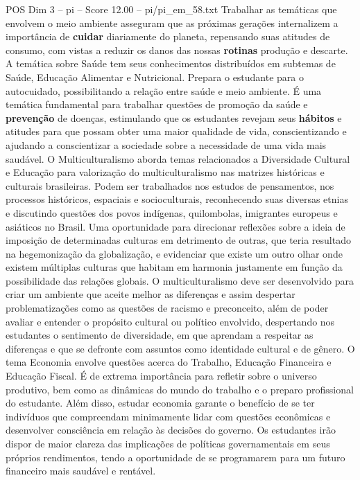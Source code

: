 \begin{textsample}{POS Dim 3 – pi – Score 12.00 – pi/pi\_em\_58.txt}
Trabalhar as temáticas que envolvem o meio ambiente asseguram que as próximas gerações internalizem a importância de \textbf{cuidar} diariamente do planeta, repensando suas atitudes de consumo, com vistas a reduzir os danos das nossas \textbf{rotinas} produção e descarte.
A temática sobre Saúde tem seus conhecimentos distribuídos em subtemas de Saúde, Educação Alimentar e Nutricional.
Prepara o estudante para o autocuidado, possibilitando a relação entre saúde e meio ambiente.
É uma temática fundamental para trabalhar questões de promoção da saúde e \textbf{prevenção} de doenças, estimulando que os estudantes revejam seus \textbf{hábitos} e atitudes para que possam obter uma maior qualidade de vida, conscientizando e ajudando a conscientizar a sociedade sobre a necessidade de uma vida mais saudável.
O Multiculturalismo aborda temas relacionados a Diversidade Cultural e Educação para valorização do multiculturalismo nas matrizes históricas e culturais brasileiras.
Podem ser trabalhados nos estudos de pensamentos, nos processos históricos, espaciais e socioculturais, reconhecendo suas diversas etnias e discutindo questões dos povos indígenas, quilombolas, imigrantes europeus e asiáticos no Brasil.
Uma oportunidade para direcionar reflexões sobre a ideia de imposição de determinadas culturas em detrimento de outras, que teria resultado na hegemonização da globalização, e evidenciar que existe um outro olhar onde existem múltiplas culturas que habitam em harmonia justamente em função da possibilidade das relações globais.
O multiculturalismo deve ser desenvolvido para criar um ambiente que aceite melhor as diferenças e assim despertar problematizações como as questões de racismo e preconceito, além de poder avaliar e entender o propósito cultural ou político envolvido, despertando nos estudantes o sentimento de diversidade, em que aprendam a respeitar as diferenças e que se defronte com assuntos como identidade cultural e de gênero.
O tema Economia envolve questões acerca do Trabalho, Educação Financeira e Educação Fiscal.
É de extrema importância para refletir sobre o universo produtivo, bem como as dinâmicas do mundo do trabalho e o preparo profissional do estudante.
Além disso, estudar economia garante o benefício de se ter indivíduos que compreendam minimamente lidar com questões econômicas e desenvolver consciência em relação às decisões do governo.
Os estudantes irão dispor de maior clareza das implicações de políticas governamentais em seus próprios rendimentos, tendo a oportunidade de se programarem para um futuro financeiro mais saudável e rentável.

\end{textsample}
